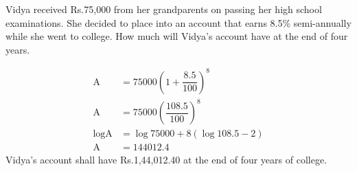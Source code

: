 
%
%
%
%
% 

\question[3] Vidya received Rs.75,000 from her grandparents on passing her high school examinations. She decided to place into an account that earns 8.5\% semi-annually while she went to college. How much will Vidya's account have at the end of four years.

\ifprintanswers
\fi 

\begin{solution}[\halfpage]
	\begin{align}
			 \text{A} &= 75000\left(1 + \dfrac{8.5}{100}\right)^8 \\
			 \text{A} &= 75000\left(\dfrac{108.5}{100}\right)^8 \\			
		\log \text{A} &= \log 75000 + 8\left(\log 108.5 - 2\right) \\
			 \text{A} &= 144012.4	
	\end{align}
	Vidya's account shall have Rs.1,44,012.40 at the end of four years of college.
\end{solution}
